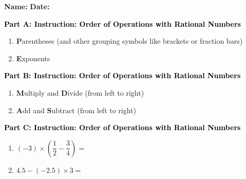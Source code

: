 \documentclass[12pt, letterpaper, fleqn]{article}
\begin{document}
\textbf{Name:} \underline{\hspace{5cm}}
\hfill
\textbf{Date:} \underline{\hspace{3cm}}\\

\begin{tcolorbox}[colback=customteal!20]
\large\textcolor{black}{\textbf{Part A: Instruction: Order of Operations with Rational Numbers}}
\end{tcolorbox}

\vspace{3mm}

\begin{enumerate}[itemsep=2.2cm, leftmargin=0.6cm]
\item \textbf{P}arentheses (and other grouping symbols like brackets or fraction bars)
\item \textbf{E}xponents
\end{enumerate}

\newpage

\begin{tcolorbox}[colback=customteal!20]
\large\textcolor{black}{\textbf{Part B: Instruction: Order of Operations with Rational Numbers}}
\end{tcolorbox}

\vspace{3mm}

\begin{enumerate}[itemsep=2.2cm, leftmargin=0.6cm, resume]
\item \textbf{M}ultiply and \textbf{D}ivide (from left to right)
\item \textbf{A}dd and \textbf{S}ubtract (from left to right)
\end{enumerate}

\newpage

\begin{tcolorbox}[colback=customteal!20]
\large\textcolor{black}{\textbf{Part C: Instruction: Order of Operations with Rational Numbers}}
\end{tcolorbox}

\vspace{3mm}

\begin{enumerate}[itemsep=2.2cm, leftmargin=0.6cm, resume]
\item $(-3) \times \left(\dfrac{1}{2} - \dfrac{3}{4}\right) =$
\item $4.5 - (-2.5) \times 3 =$
\end{enumerate}
\end{document}
